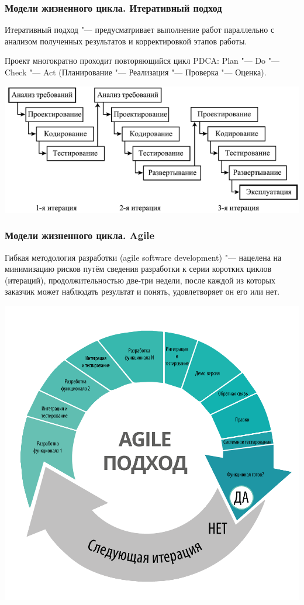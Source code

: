 \documentclass{../industrial-development}
\begin{document}
\begin{frame} \frametitle{Модели жизненного цикла. Итеративный подход}
	Итеративный подход "--- предусматривает выполнение работ параллельно с анализом полученных результатов и корректировкой этапов работы.
	
	Проект многократно проходит повторяющийся цикл PDCA: Plan "--- Do "--- Check "--- Act (Планирование "--- Реализация "--- Проверка "--- Оценка).
	
	\centerline{\includegraphics[height=0.50\textheight]{image12.png}}
\end{frame}
\lecturenotes


\begin{frame} \frametitle{Модели жизненного цикла. Agile}
	Гибкая методология разработки (agile software development) "--- нацелена на минимизацию рисков путём сведения разработки к серии коротких циклов (итераций), продолжительностью две-три недели, после каждой из которых заказчик может наблюдать результат и понять, удовлетворяет он его или нет.
	
	\centerline{\includegraphics[height=0.50\textheight]{image18.png}}
\end{frame}
\lecturenotes
\end{document}
